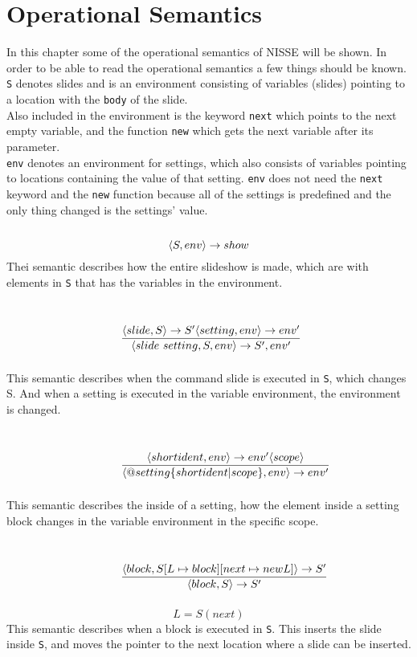 \chapter{Operational Semantics}
In this chapter some of the operational semantics of NISSE will be shown. In order to be able to read the operational semantics a few things should be known. \\
\texttt{S} denotes slides and is an environment consisting of variables (slides) pointing to a location with the \texttt{body} of the slide. \\
Also included in the environment is the keyword \texttt{next} which points to the next empty variable, and the function \texttt{new} which gets the next variable after its parameter. \\
\texttt{env} denotes an environment for settings, which also consists of variables pointing to locations containing the value of that setting. \texttt{env} does not need the \texttt{next} keyword and the \texttt{new} function because all of the settings is predefined and the only thing changed is the settings' value.
\\ \\
\noindent{$[slideshow]$}
\[ \langle S, env \rangle \rightarrow show \]
Thei semantic describes how the entire slideshow is made, which are with elements in \texttt{S} that has the variables in the environment.
\\ \\ %
\noindent{$[specification]$}
\[ \condinfrule{\langle slide, S \rangle \ra S' \langle setting, env \rangle \ra env'} { \langle slide~setting, S, env \rangle \ra S', env'}{} \]
This semantic describes when the command slide is executed in \texttt{S}, which changes S. And when a setting is executed in the variable environment, the environment is changed.
\\ \\
\noindent{$[setting]$}
\[ \condinfrule{\langle shortident, env \rangle \ra env' \langle scope \rangle} { \langle @ setting \{ shortident | scope \}, env \rangle \ra env'}{} \]
This semantic describes the inside of a setting, how the element inside a setting block changes in the variable environment in the specific scope.
\\ \\
\noindent{$[slide]$}
\[ \condinfrule{\langle block, S[L \mapsto block] [next \mapsto new L] \rangle \ra S'} { \langle block, S \rangle \ra S'}{} \]
\[ L = S(next)\]
This semantic describes when a block is executed in \texttt{S}. This inserts the slide inside \texttt{S}, and moves the pointer to the next location where a slide can be inserted.
